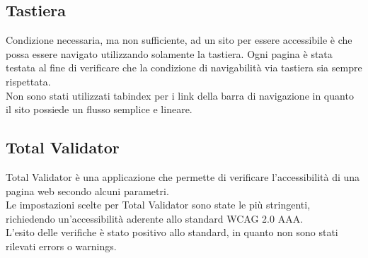 \subsection{Tastiera}
Condizione necessaria, ma non sufficiente, ad un sito per essere accessibile è che possa essere navigato utilizzando solamente la tastiera. Ogni pagina è stata testata al fine di verificare che la condizione di navigabilità via tastiera sia sempre rispettata.\\
Non sono stati utilizzati tabindex per i link della barra di navigazione in quanto il sito possiede un flusso semplice e lineare.

\subsection{Total Validator}
Total Validator è una applicazione che permette di verificare l'accessibilità di una pagina web secondo alcuni parametri.\\
Le impostazioni scelte per Total Validator sono state le più stringenti, richiedendo un'accessibilità aderente allo standard WCAG 2.0 AAA.\\
L'esito delle verifiche è stato positivo allo standard, in quanto non sono stati rilevati errors o warnings.